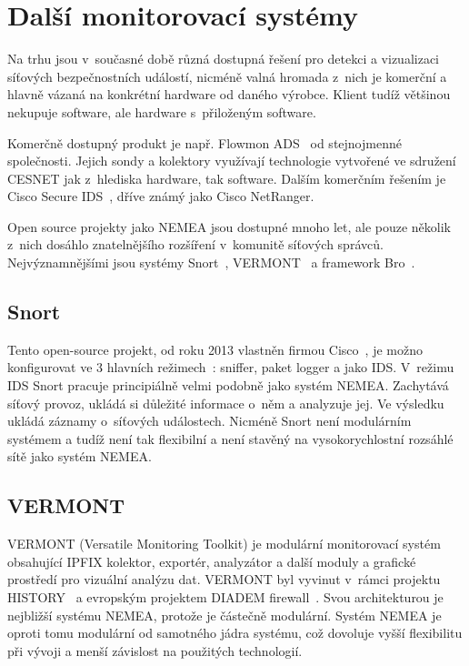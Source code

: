 \section{Další monitorovací systémy}

Na trhu jsou v~současné době různá dostupná řešení pro detekci a vizualizaci síťových bezpečnostních událostí, nicméně valná hromada z~nich je komerční a hlavně vázaná na konkrétní hardware od daného výrobce. Klient tudíž většinou nekupuje software, ale hardware s~přiloženým software.

Komerčně dostupný produkt je např. Flowmon ADS~\cite{flowmon:report}\cite{flowmon:ads} od stejnojmenné společnosti. Jejich sondy a kolektory využívají technologie vytvořené ve sdružení CESNET jak z~hlediska hardware, tak software. Dalším komerčním řešením je Cisco Secure IDS~\cite{cisco:ids}, dříve známý jako Cisco NetRanger.

Open source projekty jako NEMEA jsou dostupné mnoho let, ale pouze několik z~nich dosáhlo znatelnějšího rozšíření v~komunitě síťových správců. Nejvýznamnějšími jsou systémy Snort~\cite{snort}, VERMONT~\cite{vermont} a framework Bro~\cite{bro}. 

\subsection*{Snort}
Tento open-source projekt, od roku 2013 vlastněn firmou Cisco~\cite{snort:cisco}, je možno konfigurovat ve 3 hlavních režimech~\cite{snort:modes}: sniffer, paket logger a jako IDS. V~režimu IDS Snort pracuje principiálně velmi podobně jako systém NEMEA. Zachytává síťový provoz, ukládá si důležité informace o~něm a analyzuje jej. Ve výsledku ukládá záznamy o~síťových událostech. Nicméně Snort není modulárním systémem a tudíž není tak flexibilní a není stavěný na vysokorychlostní rozsáhlé sítě jako systém NEMEA.

\subsection*{VERMONT}

VERMONT (Versatile Monitoring Toolkit) je modulární monitorovací systém obsahující IPFIX kolektor, exportér, analyzátor a další moduly a grafické prostředí pro vizuální analýzu dat. VERMONT byl vyvinut v~rámci projektu HISTORY~\cite{vermont:history} a evropským projektem DIADEM firewall~\cite{vermont:diadem}. Svou architekturou je nejbližší systému NEMEA, protože je částečně modulární. Systém NEMEA je oproti tomu modulární od samotného jádra systému, což dovoluje vyšší flexibilitu při vývoji a menší závislost na použitých technologií.


